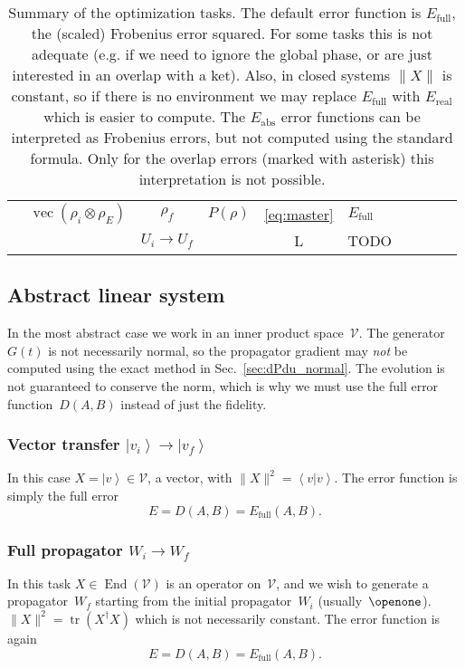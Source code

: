 \documentclass[aps, pra, a4paper, longbibliography, superscriptaddress]{revtex4-1}
\newcommand{\I}{\openone}
\newcommand{\be}{\begin{equation}}
\newcommand{\ee}{\end{equation}}
\newcommand{\ket}[1]{\left| #1 \right \rangle}
\newcommand{\braket}[2]{\left \langle #1 | #2 \right \rangle}
\newcommand{\hilb}[1]{\mathcal{#1}}
\DeclareMathOperator{\End}{End} %
\DeclareMathOperator{\tr}{tr}
\DeclareMathOperator{\cvec}{vec}
\begin{document}
\begin{table}
\begin{tabular}{ll|c|c|c|l|l|l|l|l}
& $\cvec(\rho_i \otimes \rho_E)$ & $\rho_f$ & $P(\rho)$ &
\eqref{eq:master} & $E_\text{full}$\\
& & $U_i \to U_f$ && L & TODO
\end{tabular}
\caption{Summary of the optimization tasks.
The default error function is $E_\text{full}$, the (scaled) Frobenius error squared.
For some tasks this is not adequate (e.g. if we need to ignore the global phase, or are just interested in an overlap with a ket).
Also, in closed systems $\|X\|$ is constant, so if there is no environment we may replace $E_\text{full}$ with $E_\text{real}$
which is easier to compute.
The $E_\text{abs}$ error functions can be interpreted as Frobenius errors, but not computed using the standard formula.
Only for the overlap errors (marked with asterisk) this interpretation is not possible.
\label{table:tasks}
}
\end{table}


\subsection{Abstract linear system}

In the most abstract case we work in an inner product space~$\hilb{V}$.
The generator~$G(t)$ is not necessarily normal, so
the propagator gradient may \emph{not} be computed using the exact
method in Sec.~\ref{sec:dPdu_normal}.
The evolution is not guaranteed to conserve the norm, which is why we must
use the full error function~$D(A,B)$ instead of just the fidelity.


\subsubsection{Vector transfer $\ket{v_i} \to \ket{v_f}$}

In this case $X = \ket{v} \in \hilb{V}$, a vector, with
$\|X\|^2 = \braket{v}{v}$.
The error function is simply the full error
\be
E = D(A, B) = E_\text{full}(A, B).
\ee

\subsubsection{Full propagator $W_i \to W_f$}

In this task
$X \in \End(\hilb{V})$
is an operator on~$\hilb{V}$, and
we wish to generate a propagator~$W_f$
starting from the initial propagator~$W_i$ (usually~$\I$).
$\|X\|^2 = \tr(X^\dagger X)$ which is not necessarily constant.
The error function is again
\be
E = D(A, B) = E_\text{full}(A, B).
\ee
\end{document}
